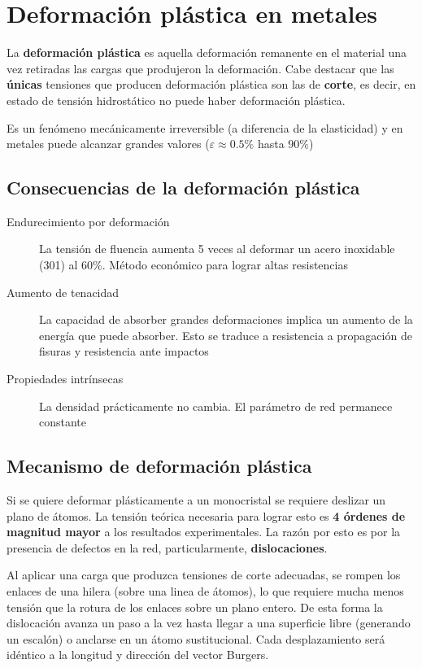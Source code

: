 \section{Deformación plástica en metales}

La \textbf{deformación plástica} es aquella deformación remanente en el material una vez retiradas las cargas que produjeron la deformación. Cabe destacar que las \textbf{únicas} tensiones que producen deformación plástica son las de \textbf{corte}, es decir, en estado de tensión hidrostático no puede haber deformación plástica.

Es un fenómeno mecánicamente irreversible (a diferencia de la elasticidad) y en metales puede alcanzar grandes valores ($\varepsilon \approx  0.5\%$ hasta $90\%$)

\subsection{Consecuencias de la deformación plástica}

\begin{description}
	\item[Endurecimiento por deformación]  La tensión de fluencia aumenta 5 veces al deformar un acero inoxidable (301) al 60\%. Método económico para lograr altas resistencias
	\item[Aumento de tenacidad] La capacidad de absorber grandes deformaciones implica un aumento de la energía que puede absorber. Esto se traduce a resistencia a propagación de fisuras y resistencia ante impactos
	\item[Propiedades intrínsecas] La densidad prácticamente no cambia. El parámetro de red permanece constante 
\end{description}

\subsection{Mecanismo de deformación plástica}

Si se quiere deformar plásticamente a un monocristal se requiere deslizar un plano de átomos. La tensión teórica necesaria para lograr esto es \textbf{4 órdenes de magnitud mayor} a los resultados experimentales. La razón por esto es por la presencia de defectos en la red, particularmente, \textbf{dislocaciones}.

Al aplicar una carga que produzca tensiones de corte adecuadas, se rompen los enlaces de una hilera (sobre una linea de átomos), lo que requiere mucha menos tensión que la rotura de los enlaces sobre un plano entero. De esta forma la dislocación avanza un paso a la vez hasta llegar a una superficie libre (generando un escalón) o anclarse en un átomo sustitucional. Cada desplazamiento será idéntico a la longitud y dirección del vector Burgers.

